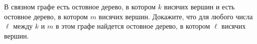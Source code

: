 В связном графе есть остовное дерево, в котором $k$ висячих вершин и есть остовное дерево, в котором $m$
висячих вершин. Докажите, что для любого числа $\ell$ между $k$ и $m$ в этом графе найдется остовное
дерево, в котором $\ell$ висячих вершин.
